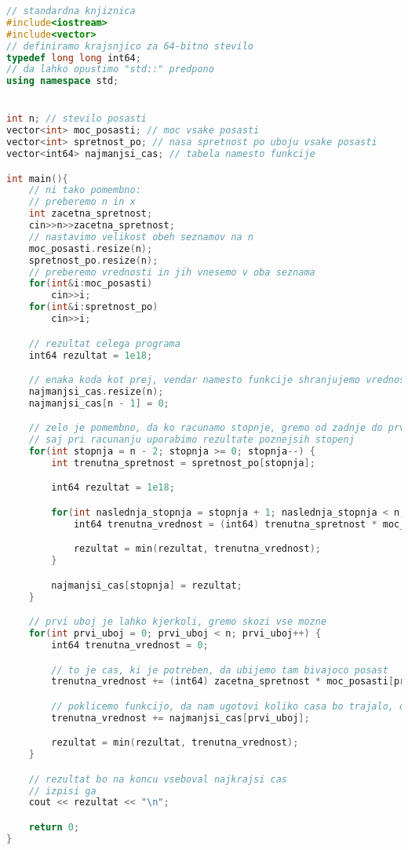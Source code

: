 \begin{lstlisting}[label={lst:code3}, language=C++]
// standardna knjiznica
#include<iostream>
#include<vector>
// definiramo krajsnjico za 64-bitno stevilo
typedef long long int64;
// da lahko opustimo "std::" predpono
using namespace std;


int n; // stevilo posasti
vector<int> moc_posasti; // moc vsake posasti
vector<int> spretnost_po; // nasa spretnost po uboju vsake posasti
vector<int64> najmanjsi_cas; // tabela namesto funkcije

int main(){
    // ni tako pomembno:
    // preberemo n in x
    int zacetna_spretnost;
    cin>>n>>zacetna_spretnost;
    // nastavimo velikost obeh seznamov na n
    moc_posasti.resize(n);
    spretnost_po.resize(n);
    // preberemo vrednosti in jih vnesemo v oba seznama
    for(int&i:moc_posasti)
        cin>>i;
    for(int&i:spretnost_po)
        cin>>i;

    // rezultat celega programa
    int64 rezultat = 1e18;

    // enaka koda kot prej, vendar namesto funkcije shranjujemo vrednosti v tabelo
    najmanjsi_cas.resize(n);
    najmanjsi_cas[n - 1] = 0;

    // zelo je pomembno, da ko racunamo stopnje, gremo od zadnje do prve,
    // saj pri racunanju uporabimo rezultate poznejsih stopenj
    for(int stopnja = n - 2; stopnja >= 0; stopnja--) {
        int trenutna_spretnost = spretnost_po[stopnja];

        int64 rezultat = 1e18;

        for(int naslednja_stopnja = stopnja + 1; naslednja_stopnja < n; naslednja_stopnja++) {
            int64 trenutna_vrednost = (int64) trenutna_spretnost * moc_posasti[naslednja_stopnja] + najmanjsi_cas[naslednja_stopnja];

            rezultat = min(rezultat, trenutna_vrednost);
        }

        najmanjsi_cas[stopnja] = rezultat;
    }

    // prvi uboj je lahko kjerkoli, gremo skozi vse mozne
    for(int prvi_uboj = 0; prvi_uboj < n; prvi_uboj++) {
        int64 trenutna_vrednost = 0;

        // to je cas, ki je potreben, da ubijemo tam bivajoco posast
        trenutna_vrednost += (int64) zacetna_spretnost * moc_posasti[prvi_uboj];

        // poklicemo funkcijo, da nam ugotovi koliko casa bo trajalo, da pridemo do konca
        trenutna_vrednost += najmanjsi_cas[prvi_uboj];

        rezultat = min(rezultat, trenutna_vrednost);
    }

    // rezultat bo na koncu vseboval najkrajsi cas
    // izpisi ga
    cout << rezultat << "\n";

    return 0;
}
\end{lstlisting}